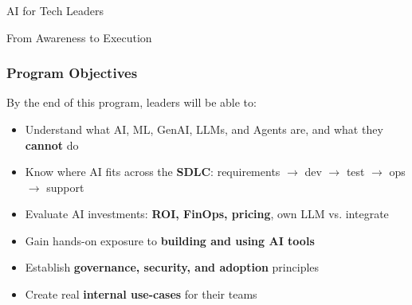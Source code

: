 \begin{frame}[fragile]\frametitle{}
\begin{center}
{\Large AI for Tech Leaders}

{\large From Awareness to Execution}
\end{center}
\end{frame}

\begin{frame}[fragile]\frametitle{Program Objectives}
By the end of this program, leaders will be able to:
\begin{itemize}
\item Understand what AI, ML, GenAI, LLMs, and Agents are, and what they \textbf{cannot} do
\item Know where AI fits across the \textbf{SDLC}: requirements $\rightarrow$ dev $\rightarrow$ test $\rightarrow$ ops $\rightarrow$ support
\item Evaluate AI investments: \textbf{ROI, FinOps, pricing}, own LLM vs. integrate
\item Gain hands-on exposure to \textbf{building and using AI tools}
\item Establish \textbf{governance, security, and adoption} principles
\item Create real \textbf{internal use-cases} for their teams
\end{itemize}
\end{frame}


